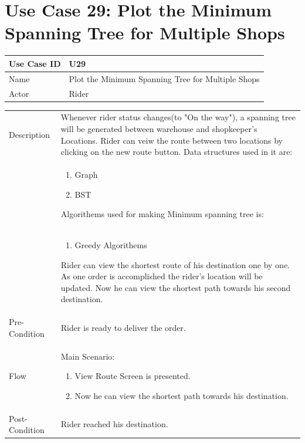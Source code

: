 \documentclass[12pt,a4paper]{report}
\begin{document}
\section{Use Case 29: Plot the Minimum Spanning Tree for Multiple Shops}

\begin{tabular}{ | m{3cm} | m{12cm}| } \hline
Use Case ID &  U29 \\\hline

Name  	    &  Plot the Minimum Spanning Tree for Multiple Shops \\ \hline

Actor     	& Rider \\ \hline
\end{tabular}
\begin{tabular}{ | m{3cm} | m{12cm}| } \hline
Description &     Whenever rider status changes(to "On the way"), a spanning tree will be  generated between warehouse and shopkeeper's Locations. Rider can veiw the route between two locations by clicking on the new route button.
 Data structures used in it are:\\
&\begin{enumerate}
   \item Graph
   \item BST 
\end{enumerate}
Algorithems used for making Minimum spanning tree is: \\
&\begin{enumerate}
   \item Greedy Algorithems
\end{enumerate}
Rider can view the shortest route of his destination one by one. As one order is accomplished the rider's location will be updated. Now he can view the shortest path towards his second destination.
\\
\hline

Pre-Condition &  Rider is ready to deliver the order.  \\ \hline

Flow & Main Scenario:

\begin{enumerate}
\item View Route Screen is presented.
\item Now he can view the shortest path towards his destination.
\end{enumerate}

\\ \hline

Post-Condition &  Rider reached his destination. \\ \hline

\end{tabular}
\newpage
\end{document}
